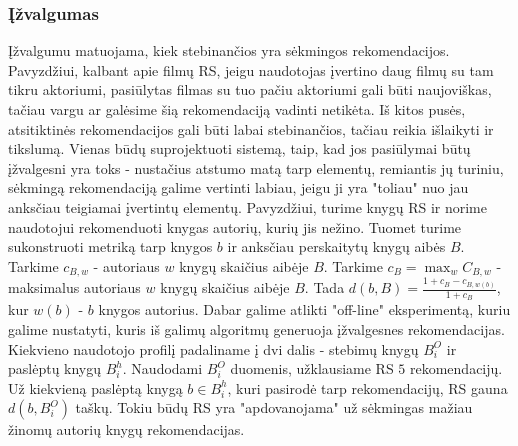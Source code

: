 \documentclass{VUMIFInfMagistrinis}
\begin{document}
\subsubsection{Įžvalgumas}
Įžvalgumu matuojama, kiek stebinančios yra sėkmingos rekomendacijos. Pavyzdžiui, kalbant apie filmų RS, jeigu naudotojas įvertino daug filmų su tam tikru aktoriumi, pasiūlytas filmas su tuo pačiu aktoriumi gali būti naujoviškas, tačiau vargu ar galėsime šią rekomendaciją vadinti netikėta. Iš kitos pusės, atsitiktinės rekomendacijos gali būti labai stebinančios, tačiau reikia išlaikyti ir tikslumą.
\newline
\indent
Vienas būdų suprojektuoti sistemą, taip, kad jos pasiūlymai būtų įžvalgesni yra toks - nustačius atstumo matą tarp elementų, remiantis jų turiniu, sėkmingą rekomendaciją galime vertinti labiau, jeigu ji yra "toliau" nuo jau anksčiau teigiamai įvertintų elementų. Pavyzdžiui, turime knygų RS ir norime naudotojui rekomenduoti knygas autorių, kurių jis nežino. Tuomet turime sukonstruoti metriką tarp knygos $b$ ir anksčiau perskaitytų knygų aibės $B$. Tarkime $c_{B,w}$ - autoriaus $w$ knygų skaičius aibėje $B$. Tarkime $c_B= \max _w C_{B,w}$ - maksimalus autoriaus $w$ knygų skaičius aibėje $B$. Tada $d(b, B)= \frac{1+c_B - c_{B,w(b)}}{1+c_B}$, kur $w(b)$ - $b$ knygos autorius.
\newline
\indent
Dabar galime atlikti "off-line" eksperimentą, kuriu galime nustatyti, kuris iš galimų algoritmų generuoja įžvalgesnes rekomendacijas. Kiekvieno naudotojo profilį padaliname į dvi dalis - stebimų knygų $B_i^O$ ir paslėptų knygų $B_i^h$. Naudodami $B_i^O$ duomenis, užklausiame RS $5$ rekomendacijų. Už kiekvieną paslėptą knygą $b \in B_i^h$, kuri pasirodė tarp rekomendacijų, RS gauna $d(b, B_i^O)$ taškų. Tokiu būdų RS yra "apdovanojama" už sėkmingas mažiau žinomų autorių knygų rekomendacijas.
\end{document}
